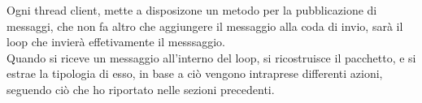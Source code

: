 \documentclass{article}
\begin{document}
Ogni thread client, mette a disposizone un metodo per la pubblicazione di messaggi, che non fa altro che aggiungere il messaggio alla coda di invio, sarà il loop che invierà effetivamente il messsaggio.\\ Quando si riceve un messaggio all'interno del loop, si ricostruisce il pacchetto, e si estrae la tipologia di esso, in base a ciò vengono intraprese differenti azioni, seguendo ciò che ho riportato nelle sezioni precedenti.
\end{document}
